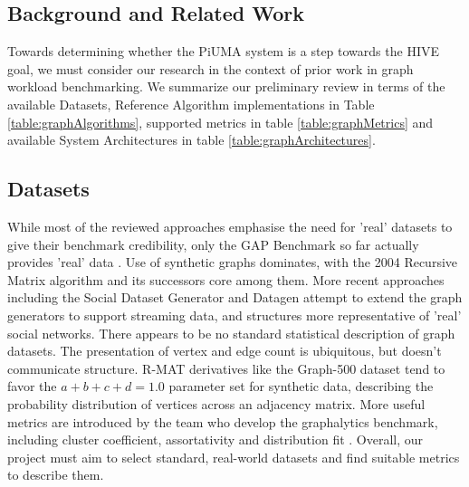 \documentclass[letterpaper, 10pt]{article}
\begin{document}
\begin{multicols}{2}
    \section{Background and Related Work}
        \par{Towards determining whether the PiUMA system is a step towards the HIVE goal, we must consider our research in the context of prior work in graph workload benchmarking. 
        We summarize our preliminary review in terms of the available Datasets, Reference Algorithm implementations in Table \ref{table:graphAlgorithms}, supported metrics in table \ref{table:graphMetrics} and available System Architectures in table \ref{table:graphArchitectures}.}

        \subsection{Datasets}
        \par{While most of the reviewed approaches emphasise the need for 'real' datasets to give their benchmark credibility, only the GAP Benchmark so far actually provides 'real' data \cite{Beamer2017}. 
        Use of synthetic graphs dominates, with the 2004 Recursive Matrix algorithm \cite{Chakrabarti2004} and its successors core among them. 
        More recent approaches including the Social Dataset Generator \cite{Angles2013} and Datagen \cite{Capota2015} attempt to extend the graph generators to support streaming data, and structures more representative of 'real' social networks.
        There appears to be no standard statistical description of graph datasets. 
        The presentation of vertex and edge count is ubiquitous, but doesn't communicate structure. 
        R-MAT derivatives like the Graph-500 dataset \cite{Murphy2010} tend to favor the $a+b+c+d=1.0$} parameter set for synthetic data, describing the probability distribution of vertices across an adjacency matrix.
        More useful metrics are introduced by the team who develop the graphalytics benchmark, including cluster coefficient, assortativity and distribution fit \cite{Capota2015}.
        Overall, our project must aim to select standard, real-world datasets and find suitable metrics to describe them.


\end{multicols}
\end{document}
